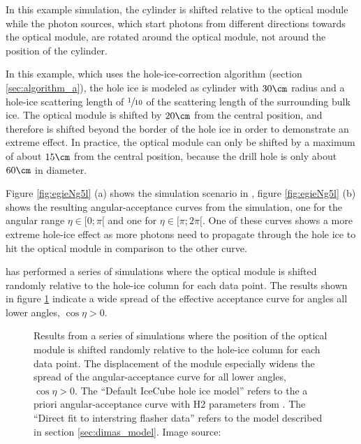 In this example simulation, the cylinder is shifted relative to the optical module while the photon sources, which start photons from different directions towards the optical module, are rotated around the optical module, not around the position of the cylinder.


In this example, which uses the hole-ice-correction algorithm (section \ref{sec:algorithm_a}), the hole ice is modeled as cylinder with $30\cm$ radius and a hole-ice scattering length of $\sfrac{1}{10}$ of the scattering length of the surrounding bulk ice. The optical module is shifted by $20\cm$ from the central position, and therefore is shifted beyond the border of the hole ice in order to demonstrate an extreme effect. In practice, the optical module can only be shifted by a maximum of about $15\cm$ from the central position, because the drill hole is only about $60\cm$ in diameter.

Figure \ref{fig:egieNg5l} (a) shows the simulation scenario in \steamshovel, figure \ref{fig:egieNg5l} (b) shows the resulting angular-acceptance curves from the simulation, one for the angular range $\eta \in [0;\pi[$ and one for $\eta \in [\pi; 2\pi[$. One of these curves shows a more extreme hole-ice effect as more photons need to propagate through the hole ice to hit the optical module in comparison to the other curve.

\rongen \cite{icrc17pocam} has performed a series of simulations where the optical module is shifted randomly relative to the hole-ice column for each data point. The results shown in figure \ref{fig:zao5Mah0} indicate a wide spread of the effective acceptance curve for angles all lower angles, $\cos \eta > 0$.

\begin{figure}[htbp]
  \caption{Results from a series of simulations where the position of the optical module is shifted randomly relative to the hole-ice column for each data point. The displacement of the module especially widens the spread of the angular-acceptance curve for all lower angles, $\cos \eta > 0$. The \enquote{Default IceCube hole ice model} refers to the a priori angular-acceptance curve with H2 parameters from \cite{icepaper}. The \enquote{Direct fit to interstring flasher data} refers to the model described in section \ref{sec:dimas_model}. Image source: \cite{icrc17pocam}}
  \label{fig:zao5Mah0}
\end{figure}
